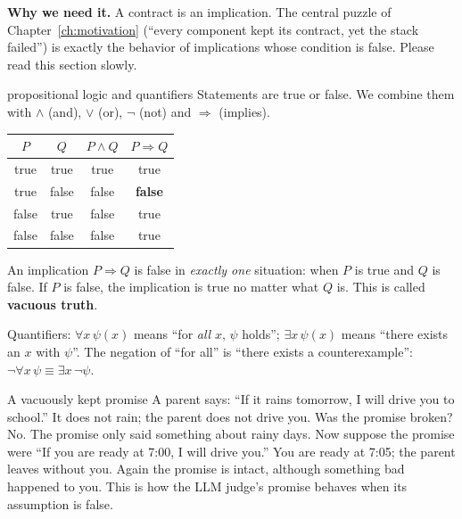 \textbf{Why we need it.} A contract is an implication. The central puzzle of Chapter~\ref{ch:motivation} (``every component kept its contract, yet the stack failed'') is exactly the behavior of implications whose condition is false. Please read this section slowly.

\begin{toolbox}{propositional logic and quantifiers}
Statements are true or false. We combine them with $\wedge$ (and), $\vee$ (or), $\neg$ (not) and $\Rightarrow$ (implies).

\begin{center}
\begin{tabular}{cc|cc}
\toprule
$P$ & $Q$ & $P\wedge Q$ & $P\Rightarrow Q$\\
\midrule
true & true & true & true\\
true & false & false & \textbf{false}\\
false & true & false & true\\
false & false & false & true\\
\bottomrule
\end{tabular}
\end{center}

An implication $P\Rightarrow Q$ is false in \emph{exactly one} situation: when $P$ is true and $Q$ is false. If $P$ is false, the implication is true no matter what $Q$ is. This is called \textbf{vacuous truth}.

Quantifiers: $\forall x\,\psi(x)$ means ``for \emph{all} $x$, $\psi$ holds''; $\exists x\,\psi(x)$ means ``there exists an $x$ with $\psi$''. The negation of ``for all'' is ``there exists a counterexample'': $\neg\forall x\,\psi \equiv \exists x\,\neg\psi$.
\end{toolbox}

\begin{story}{A vacuously kept promise}
A parent says: ``If it rains tomorrow, I will drive you to school.'' It does not rain; the parent does not drive you. Was the promise broken? No. The promise only said something about rainy days. Now suppose the promise were ``If you are ready at 7:00, I will drive you.'' You are ready at 7:05; the parent leaves without you. Again the promise is intact, although something bad happened to you. This is how the LLM judge's promise behaves when its assumption is false.
\end{story}



